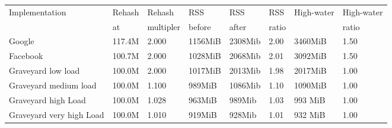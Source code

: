 \begin{center}
\begin{tabular}{llllllll}
Implementation        & Rehash & Rehash      & RSS     & RSS     & RSS   & High-water & High-water \\
                      & at     & multipler   & before  & after   & ratio &            & ratio      \\ \hline
Google                & 117.4M & 2.000       & 1156MiB & 2308Mib & 2.00  & 3460MiB    & 1.50       \\
Facebook              & 100.7M & 2.000       & 1028MiB & 2068Mib & 2.01  & 3092MiB    & 1.50       \\
Graveyard low load    & 100.0M & 2.000       & 1017MiB & 2013Mib & 1.98  & 2017MiB    & 1.00       \\
Graveyard medium load & 100.0M & 1.100       &  989MiB & 1086Mib & 1.10  & 1090MiB    & 1.00       \\
Graveyard high Load   & 100.0M & 1.028       &  963MiB &  989Mib & 1.03  & 993 MiB    & 1.00       \\
Graveyard very high Load & 100.0M & 1.010       &  919MiB &  928Mib & 1.01  & 932 MiB    & 1.00       \\
\end{tabular}
\end{center}
